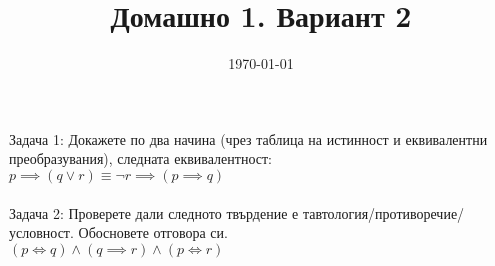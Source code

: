 \documentclass{article}
\begin{document}
     
\title{Домашно 1. Вариант 2}
\date{\today}
\maketitle
    
Задача 1: Докажете по два начина (чрез таблица на истинност и еквивалентни преобразувания), следната еквивалентност: \\

$ p \implies (q \lor r) \equiv \lnot r \implies (p \implies q) $ \\\\

Задача 2: Проверете дали следното твърдение е тавтология/противоречие/условност. Обосновете отговора си. \\

$ (p \iff q) \land (q \implies r) \land (p \iff r) $
\end{document}
